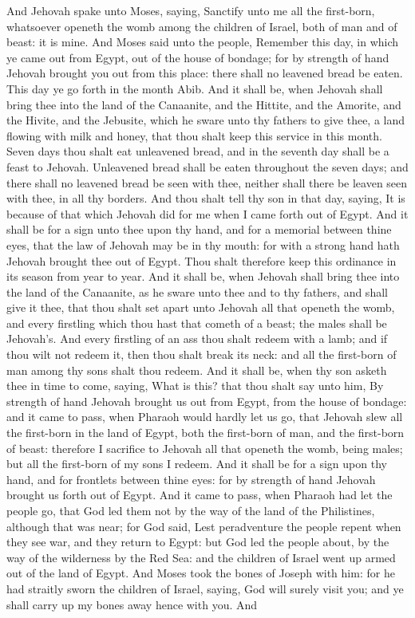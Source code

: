 And Jehovah spake unto Moses, saying, Sanctify unto me all the first-born, whatsoever openeth the womb among the children of Israel, both of man and of beast: it is mine.  And Moses said unto the people, Remember this day, in which ye came out from Egypt, out of the house of bondage; for by strength of hand Jehovah brought you out from this place: there shall no leavened bread be eaten. This day ye go forth in the month Abib. And it shall be, when Jehovah shall bring thee into the land of the Canaanite, and the Hittite, and the Amorite, and the Hivite, and the Jebusite, which he sware unto thy fathers to give thee, a land flowing with milk and honey, that thou shalt keep this service in this month. Seven days thou shalt eat unleavened bread, and in the seventh day shall be a feast to Jehovah. Unleavened bread shall be eaten throughout the seven days; and there shall no leavened bread be seen with thee, neither shall there be leaven seen with thee, in all thy borders. And thou shalt tell thy son in that day, saying, It is because of that which Jehovah did for me when I came forth out of Egypt. And it shall be for a sign unto thee upon thy hand, and for a memorial between thine eyes, that the law of Jehovah may be in thy mouth: for with a strong hand hath Jehovah brought thee out of Egypt. Thou shalt therefore keep this ordinance in its season from year to year.  And it shall be, when Jehovah shall bring thee into the land of the Canaanite, as he sware unto thee and to thy fathers, and shall give it thee, that thou shalt set apart unto Jehovah all that openeth the womb, and every firstling which thou hast that cometh of a beast; the males shall be Jehovah’s. And every firstling of an ass thou shalt redeem with a lamb; and if thou wilt not redeem it, then thou shalt break its neck: and all the first-born of man among thy sons shalt thou redeem. And it shall be, when thy son asketh thee in time to come, saying, What is this? that thou shalt say unto him, By strength of hand Jehovah brought us out from Egypt, from the house of bondage: and it came to pass, when Pharaoh would hardly let us go, that Jehovah slew all the first-born in the land of Egypt, both the first-born of man, and the first-born of beast: therefore I sacrifice to Jehovah all that openeth the womb, being males; but all the first-born of my sons I redeem. And it shall be for a sign upon thy hand, and for frontlets between thine eyes: for by strength of hand Jehovah brought us forth out of Egypt.  And it came to pass, when Pharaoh had let the people go, that God led them not by the way of the land of the Philistines, although that was near; for God said, Lest peradventure the people repent when they see war, and they return to Egypt: but God led the people about, by the way of the wilderness by the Red Sea: and the children of Israel went up armed out of the land of Egypt. And Moses took the bones of Joseph with him: for he had straitly sworn the children of Israel, saying, God will surely visit you; and ye shall carry up my bones away hence with you. And 